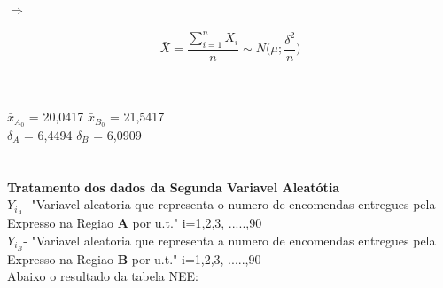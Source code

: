 \hspace{3cm} $\Longrightarrow$ \hspace{3cm}
\begin{minipage}[l]{0pt}
\[\bar{X}=\frac{\sum_{i=1}^nX_i}{n}\sim N \big(\mu;\frac{\delta^2}{n}\big)\]
\end{minipage}\\
\\
$\bar{x}_{A_0}$ = 20,0417 \qquad $\bar{x}_{B_0}$ = 21,5417 \\
$\delta_A$ = 6,4494 \qquad $\delta_B$ = 6,0909\\
\\
\\
\noindent
\textbf{Tratamento dos dados da Segunda Variavel Aleatótia} \\
$Y_{i_A}$- "Variavel aleatoria que representa o numero de encomendas entregues pela Expresso na Regiao \textbf{A} por u.t." \quad i=1,2,3, .....,90 \\
$Y_{i_B}$- "Variavel aleatoria que representa a numero de encomendas entregues pela Expresso na Regiao \textbf{B} por u.t." \quad i=1,2,3, .....,90 \\
Abaixo o resultado da tabela NEE:\\

